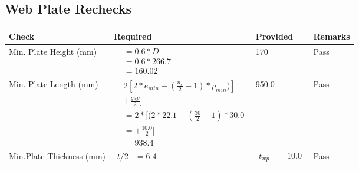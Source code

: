 \documentclass{article}%
\begin{document}
%
\newpage%
\subsection{Web Plate Rechecks}%
\label{subsec:WebPlateRechecks}%
\renewcommand{\arraystretch}{1.2}%
\begin{longtable}{|p{4cm}|p{6cm}|p{5.5cm}|p{1.5cm}|}%
\hline%
\rowcolor{OsdagGreen}%
Check&Required&Provided&Remarks\\%
\hline%
\endhead%
\hline%
Min. Plate Height (mm)&$\begin{aligned}  &= 0.6 *D\\  &= 0.6 *266.7\\  &= 160.02\end{aligned}$&170&Pass\\%
\hline%
Min. Plate Length (mm)&$\begin{aligned} & 2[2*e_{min} + ({\frac{n_r}{2}}-1) * p_{min})]\\ & +\frac{gap}{2}]\\ &=2*[(2*22.1 + (\frac{30}{2}-1) * 30.0\\ &= + \frac{10.0}{2}]\\ &=938.4\end{aligned}$&950.0&Pass\\%
\hline%
Min.Plate Thickness (mm)&$\begin{aligned} t/2 &=6.4\end{aligned}$&$\begin{aligned} t_{wp} &=10.0\end{aligned}$&Pass\\%
\hline%
\end{longtable}

%
\newpage%
\end{document}
